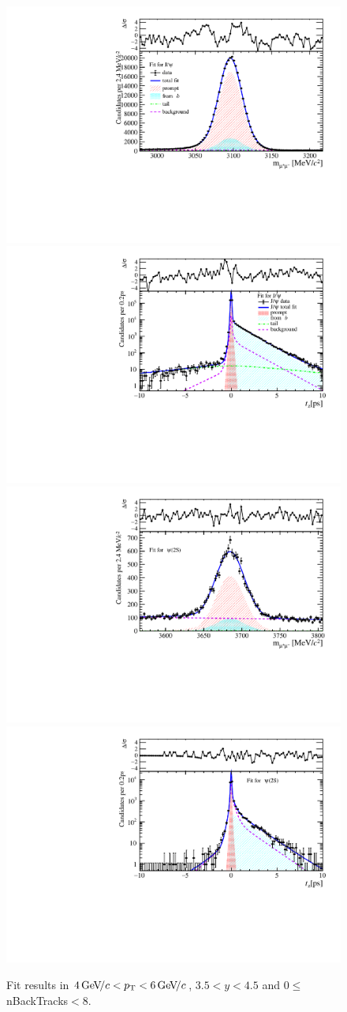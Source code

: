 \begin{figure}[H]
\begin{center}
\includegraphics[width=0.47\linewidth]{pdf/Jpsi/drawmassB/n1y3pt3.pdf}
\includegraphics[width=0.47\linewidth]{pdf/Jpsi/2DFitB/n1y3pt3.pdf}
\vspace*{-0.5cm}
\includegraphics[width=0.47\linewidth]{pdf/Psi2S/drawmassB/n1y3pt3.pdf}
\includegraphics[width=0.47\linewidth]{pdf/Psi2S/2DFitB/n1y3pt3.pdf}
\vspace*{-0.5cm}
\end{center}
\caption{Fit results in $4\text{\,Ge\kern -0.1em V\!/}c<p_{\mathrm{T}}<6\text{\,Ge\kern -0.1em V\!/}c$, $3.5<y<4.5$ and 0$\leq$nBackTracks$<$8.}
\label{Fitn1y3pt3}
\end{figure}
